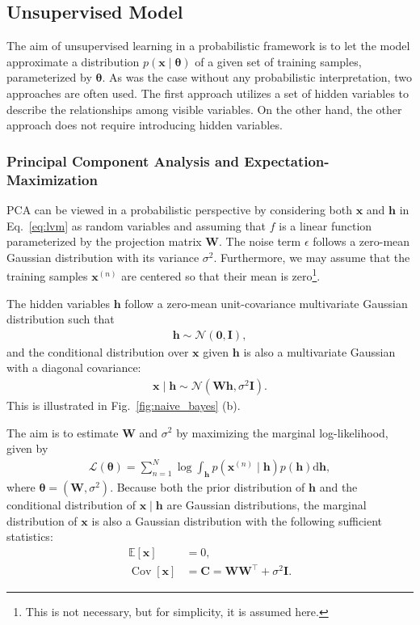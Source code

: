 \documentclass[dissertation,nocontribution,draft*]{aaltoseries}
\newcommand{\vect}[1]{\mathbf{#1}}
\newcommand{\vects}[1]{\boldsymbol{#1}}
\newcommand{\matr}[1]{\mathbf{#1}}
\newcommand{\cov}[0]{\operatorname{Cov}}
\newcommand{\vh}[0]{\vect{h}}
\newcommand{\vx}[0]{\vect{x}}
\newcommand{\mW}[0]{\matr{W}}
\newcommand{\mC}{\matr{C}}
\newcommand{\mI}{\matr{I}}
\newcommand{\vzero}[0]{\vects{0}}
\newcommand{\TT}[0]{{\vects{\theta}}}
\newcommand{\NN}[0]{\mathcal{N}}
\newcommand{\LL}[0]{\mathcal{L}}
\newcommand{\E}[0]{\mathbb{E}}
\newcommand{\dd}[1]{\text{d}{#1}}
\begin{document}
\subsection{Unsupervised Model}

The aim of unsupervised learning in a probabilistic
framework is to let the model approximate a distribution
$p(\vx \mid \TT)$ of a given set of training samples,
parameterized by $\TT$. As was the case without any
probabilistic interpretation, two approaches are often used.
The first approach utilizes a set of hidden variables to
describe the relationships among visible variables. On the
other hand, the other approach does not require
introducing hidden variables.

\subsubsection{Principal Component Analysis and
Expectation-Maximization}
\label{sec:ppca}

PCA can be viewed in a probabilistic perspective
\citep[see, e.g.,][]{Tipping1999,Roweis1998} by considering
both $\vx$ and $\vh$ in Eq.~\eqref{eq:lvm} as random
variables and assuming that $f$ is a linear function
parameterized by the projection matrix $\mW$. The noise term
$\epsilon$ follows a zero-mean Gaussian distribution with
its variance $\sigma^2$. Furthermore, we may assume that the
training samples $\vx^{(n)}$ are centered so that their
mean is zero\footnote{This is not necessary, but for
simplicity, it is assumed here.}.

The hidden variables $\vh$ follow a zero-mean
unit-covariance multivariate Gaussian distribution such that
\begin{align*}
    \vh \sim \NN(\vzero, \mI),
\end{align*}
and the conditional distribution over $\vx$ given $\vh$ is
also a multivariate Gaussian with a diagonal covariance:
\begin{align*}
    \vx \mid \vh \sim \NN(\mW \vh, \sigma^2 \mI).
\end{align*}
This is illustrated in Fig.~\ref{fig:naive_bayes} (b).

The aim is to estimate $\mW$ and $\sigma^2$ by maximizing
the marginal log-likelihood, given by
\begin{align}
    \label{eq:ppca_mll}
    \LL(\TT) = \sum_{n=1}^N \log \int_{\vh} p(\vx^{(n)} \mid \vh)
    p(\vh) \dd{\vh},
\end{align}
where $\TT=\left( \mW, \sigma^2 \right)$. Because both the prior
distribution of $\vh$ and the conditional distribution of
$\vx \mid \vh$ are Gaussian distributions, 
the marginal distribution of $\vx$ is also a Gaussian
distribution with the following sufficient statistics:
\begin{align*}
    \E\left[ \vx \right] &= 0,\\
    \cov\left[ \vx \right] &= \mC = \mW \mW^\top + \sigma^2 \mI.
\end{align*}
\end{document}
